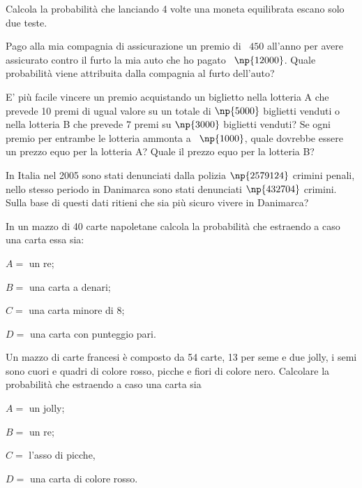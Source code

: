 \begin{esercizio}[\Ast]
 \label{ese:9.15}
Calcola la probabilità che lanciando 4 volte una moneta equilibrata escano solo due teste.
\end{esercizio}

\begin{esercizio}[\Ast]
 \label{ese:9.16}
Pago alla mia compagnia di assicurazione un premio di \officialeuro~$450$ all'anno per avere assicurato contro il furto la mia auto che ho pagato \officialeuro~$\np{12000}$. Quale probabilità viene attribuita dalla compagnia al furto dell'auto?
\end{esercizio}

\begin{esercizio}[\Ast]
 \label{ese:9.17}
E' più facile vincere un premio acquistando un biglietto nella lotteria A che prevede 10 premi di ugual valore su un totale di $\np{5000}$ biglietti venduti o nella lotteria B che prevede 7 premi su $\np{3000}$ biglietti venduti?
Se ogni premio per entrambe le lotteria ammonta a \officialeuro~$\np{1000}$, quale dovrebbe essere un prezzo equo per la lotteria A? Quale il prezzo equo per la lotteria B?
\end{esercizio}

\begin{esercizio}
 \label{ese:9.18}
In Italia nel 2005 sono stati denunciati dalla polizia $\np{2579124}$ crimini penali, nello stesso periodo in Danimarca sono stati denunciati $\np{432704}$ crimini. Sulla base di questi dati ritieni che sia più sicuro vivere in Danimarca?
\end{esercizio}

\begin{esercizio}
 \label{ese:9.19}
 In un mazzo di 40 carte napoletane calcola la probabilità che estraendo a caso una carta essa sia:
\begin{multicols}{2}
\begin{description*}
\item $ A= $ un re;
\item $ B= $ una carta a denari;
\item $ C= $ una carta minore di 8;
\item $ D = $ una carta con punteggio pari.
\end{description*}
\end{multicols}
\end{esercizio}

\begin{esercizio}
 \label{ese:9.20}
Un mazzo di carte francesi è composto da 54 carte, 13 per seme e due jolly, i semi sono cuori e quadri di colore rosso, picche e fiori di colore nero. Calcolare la probabilità che estraendo a caso una carta sia
\begin{multicols}{2}
\begin{description*}
\item $ A= $ un jolly;
\item $ B= $ un re;
\item $ C= $ l'asso di picche,
\item $ D= $ una carta di colore rosso.
\end{description*}
\end{multicols}
\end{esercizio}

